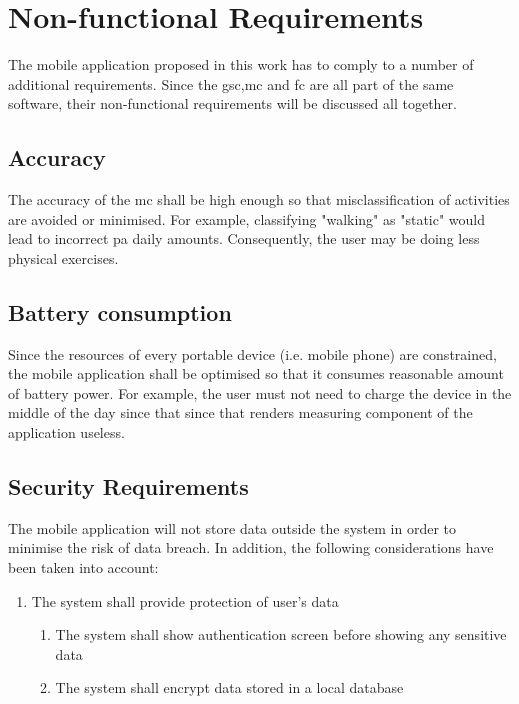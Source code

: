 \section{Non-functional Requirements}
The mobile application proposed in this work has to comply to a number of additional requirements. Since the \gls{gsc},\gls{mc} and \gls{fc} are all part of the same software, their non-functional requirements will be discussed all together.
    
    
    \subsection{Accuracy}
    The accuracy of the \gls{mc} shall be high enough so that misclassification of activities are avoided or minimised. For example, classifying "walking" as "static" would lead to incorrect \gls{pa} daily amounts. Consequently, the user may be doing less physical exercises.
    
    \subsection{Battery consumption}
    Since the resources of every portable device (i.e. mobile phone) are constrained, the mobile application shall be optimised so that it consumes reasonable amount of battery power. For example, the user must not need to charge the device in the middle of the day since that since that renders measuring component of the application useless.
    
    \subsection{Security Requirements}
    The mobile application will not store data outside the system in order to minimise the risk of data breach. In addition, the following considerations have been taken into account:
    
    \begin{enumerate}
        \item The system shall provide protection of user's data
            \begin{enumerate}
                \item The system shall show authentication screen before showing any sensitive data
                \item The system shall encrypt data stored in a local database
            \end{enumerate}
    \end{enumerate}
    

